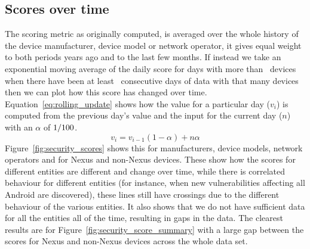 \subsection{Scores over time}
The scoring metric as originally computed, is averaged over the whole history of the device manufacturer, device model or network operator, it gives equal weight to both periods years ago and to the last few months.
If instead we take an exponential moving average of the daily score for days with more than \daSigNumDevicesDay\, devices when there have been at least \daSigNumDays\ consecutive days of data with that many devices then we can plot how this score has changed over time.
Equation~\ref{eq:rolling_update} shows how the value for a particular day ($v_i$) is computed from the previous day's value and the input for the current day ($n$) with an $\alpha$ of $1/100$.
\begin{equation}
v_i = v_{i-1} (1 - \alpha) + n \alpha
\label{eq:rolling_update}
\end{equation}
Figure~\ref{fig:security_scores} shows this for manufacturers, device models, network operators and for Nexus and non-Nexus devices.
These show how the scores for different entities are different and change over time, while there is correlated behaviour for different entities (for instance, when new vulnerabilities affecting all Android are discovered), these lines still have crossings due to the different behaviour of the various entities.
It also shows that we do not have sufficient data for all the entities all of the time, resulting in gaps in the data.
The clearest results are for Figure~\ref{fig:security_score_summary} with a large gap between the scores for Nexus and non-Nexus devices across the whole data set.
